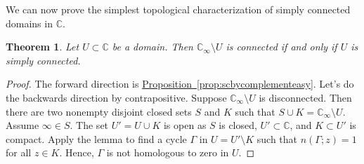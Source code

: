 \documentclass[12pt,openany]{book}
\newcommand{\C}{{\mathbb{C}}}
\theoremstyle{plain}
\newtheorem{thm}{Theorem}[section]
\theoremstyle{remark}
\theoremstyle{definition}
\theoremstyle{exercise}
\theoremstyle{example}
\newcommand{\propref}[1]{\hyperref[#1]{Proposition~\ref*{#1}}}
\begin{document}
We can now prove the simplest
topological characterization of simply connected domains in $\C$.

\begin{thm} \label{thm:scbycomplementhard}
Let $U \subset \C$ be a domain.  Then
$\C_\infty \setminus U$ is connected if and only if $U$ is simply connected.
\end{thm}

\begin{proof}
The forward direction is \propref{prop:scbycomplementeasy}.  Let's do
the backwards direction by contrapositive.  Suppose $\C_\infty
\setminus U$ is disconnected.  Then there are two nonempty disjoint closed
sets $S$ and $K$ such that $S \cup K = \C_\infty \setminus U$. 
Assume $\infty \in S$.
The set $U' = U \cup K$ is open as $S$ is closed, $U' \subset \C$,
and $K \subset U'$ is compact.  Apply the lemma to find a cycle
$\Gamma$ in $U = U' \setminus K$ such that $n(\Gamma;z) = 1$ for all $z \in
K$.  Hence, $\Gamma$ is not homologous to zero in $U$.
\end{proof}
\end{document}
